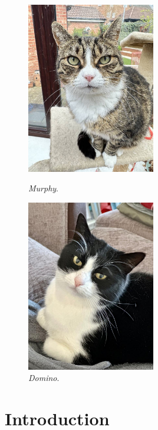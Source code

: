 \documentclass[12pt]{article}
\begin{document}
\begin{figure}[h]
    \centering
    \begin{minipage}[]{.45\textwidth}
        \centering
        \includegraphics[width=0.5\textwidth]{img/murphy.jpg}
        \caption*{\textit{Murphy}.}
    \end{minipage}\hfill\begin{minipage}[]{.45\textwidth}
        \centering
        \includegraphics[width=0.5\textwidth]{img/domino.jpg}
        \caption*{\textit{Domino}.}
    \end{minipage}
\end{figure}

\pagebreak
\tableofcontents

\pagebreak
{}
\section{Introduction}\label{sec:intro}
\end{document}
